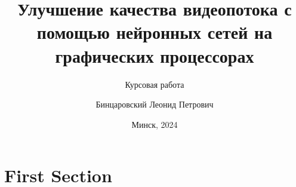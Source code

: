 \documentclass[aspectratio=169,xcolor=dvipsnames]{beamer}
\title{Улучшение качества видеопотока с помощью нейронных сетей на графических процессорах}
\subtitle{Курсовая работа}
\author[Pin-Yen] {Бинцаровский Леонид Петрович}
\institute[NTU] %
{
    Белорусский государственный университет\\
    ФПМИ, ДМА, 4 курс\\
    руководитель: старший преподаватель Пирштук Д. И.
    \vskip 3pt
}
\date{Минск, 2024} %
\begin{document}
\begin{frame}
    \titlepage
\end{frame}


\section{First Section}
\end{document}
